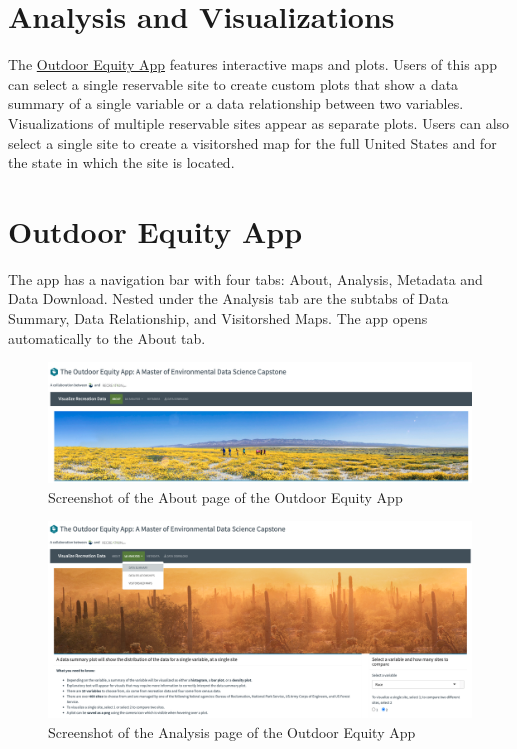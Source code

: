 \documentclass[
  11 pt,
  openany]{book}
\begin{document}
\hypertarget{analysis-and-visualizations}{%
\section{Analysis and Visualizations}\label{analysis-and-visualizations}}

The \href{https://shinyapps.bren.ucsb.edu/oe_app/}{Outdoor Equity App} features interactive maps and plots. Users of this app can select a single reservable site to create custom plots that show a data summary of a single variable or a data relationship between two variables. Visualizations of multiple reservable sites appear as separate plots. Users can also select a single site to create a visitorshed map for the full United States and for the state in which the site is located.

\hypertarget{outdoor-equity-app}{%
\section{Outdoor Equity App}\label{outdoor-equity-app}}

The app has a navigation bar with four tabs: About, Analysis, Metadata and Data Download. Nested under the Analysis tab are the subtabs of Data Summary, Data Relationship, and Visitorshed Maps. The app opens automatically to the About tab.

\begin{figure}
\includegraphics[width=5.96in]{images/screenshot_about} \caption{Screenshot of the About page of the Outdoor Equity App}\label{fig:app-screenshot1}
\end{figure}

\begin{figure}
\includegraphics[width=5.98in]{images/screenshot_data-summary} \caption{Screenshot of the Analysis page of the Outdoor Equity App}\label{fig:app-screenshot2}
\end{figure}
\end{document}
